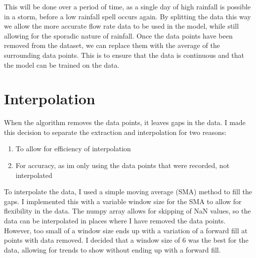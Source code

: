 \documentclass{report}
\begin{document}
This will be done over a period of time, as a single day of high rainfall is possible in a storm, before a low rainfall spell occurs again.
By splitting the data this way we allow the more accurate flow rate data to be used in the model, while still allowing for the sporadic nature of rainfall.
\vspace{1em}
\newline
Once the data points have been removed from the dataset, we can replace them with the average of the surrounding data points.
This is to ensure that the data is continuous and that the model can be trained on the data.

\section{Interpolation}

When the algorithm removes the data points, it leaves gaps in the data.
I made this decision to separate the extraction and interpolation for two reasons:
\begin{enumerate}
    \item To allow for efficiency of interpolation
    \item For accuracy, as im only using the data points that were recorded, not interpolated
\end{enumerate}

To interpolate the data, I used a simple moving average (SMA) method to fill the gaps.
I implemented this with a variable window size for the SMA to allow for flexibility in the data.
The numpy array allows for skipping of NaN values, so the data can be interpolated in places where I have removed the data points.
However, too small of a window size ends up with a variation of a forward fill at points with data removed.
I decided that a window size of 6 was the best for the data, allowing for trends to show without ending up with a forward fill.
\end{document}

